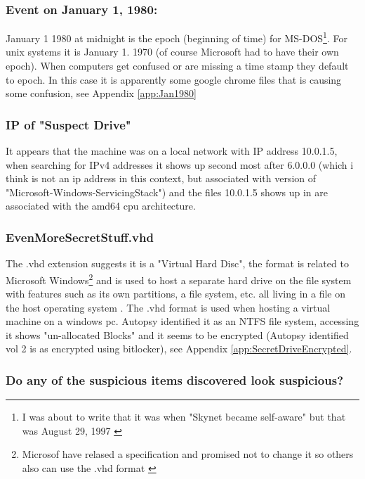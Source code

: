 \documentclass[
	letterpaper, %
	10pt, %
	unnumberedsections, %
	twoside, %
]{APAAssignment}
\begin{document}
\subsubsection{Event on January 1, 1980:}
January 1 1980 at midnight is the epoch (beginning of time) for MS-DOS\footnote{I was about to write that it was when "Skynet became self-aware" but that was August 29, 1997 \cite{enwiki:Terminator}}. For unix systems it is January 1. 1970 (of course Microsoft had to have their own epoch). When computers get confused or are missing a time stamp they default to epoch. In this case it is apparently some google chrome files that is causing some confusion, see Appendix \ref{app:Jan1980}

\subsubsection{IP of "Suspect Drive"}
It appears that the machine was on a local network with IP address 10.0.1.5, when searching for IPv4 addresses it shows up second most after 6.0.0.0 (which i think is not an ip address in this context, but associated with version of "Microsoft-Windows-ServicingStack") and the files 10.0.1.5 shows up in are associated with the amd64 cpu architecture.


\subsubsection{EvenMoreSecretStuff.vhd}
The .vhd extension suggests it is a "Virtual Hard Disc", the format is related to Microsoft Windows\footnote{Microsof have relased a specification and promised not to change it so others also can use the .vhd format \cite{VHD_Wiki}} and is used to host a separate hard drive on the file system with features such as its own partitions, a file system, etc. all living in a file on the host operating system \cite{VHD_Wiki}. The .vhd format is used when hosting a virtual machine on a windows pc. Autopsy identified it as an NTFS file system, accessing it shows "un-allocated Blocks" and it seems to be encrypted (Autopsy identified vol 2 is as encrypted using bitlocker), see Appendix \ref{app:SecretDriveEncrypted}.


\subsubsection{Do any of the suspicious items discovered look suspicious?}
\end{document}

